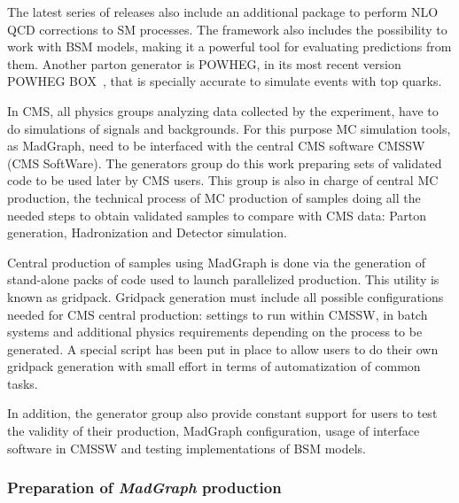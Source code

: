 The latest series of releases also include an additional package to perform NLO QCD corrections to SM processes. The framework also includes the possibility to work with BSM models, making it a powerful tool for evaluating predictions from them. Another parton generator is POWHEG, in its most recent version POWHEG BOX~\cite{Nason:2004rx, Frixione:2007vw, Alioli:2010xd}, that is specially accurate to simulate events with top quarks. %

In CMS, all physics groups analyzing data collected by the experiment, have to do simulations of signals and backgrounds. For this purpose MC simulation tools, as MadGraph, need to be interfaced with the central CMS software CMSSW (CMS SoftWare). The generators group do this work preparing sets of validated code to be used later by CMS users. This group is also in charge of central MC production, the technical process of MC production of samples doing all the needed steps to obtain validated samples to compare with CMS data: Parton generation, Hadronization and Detector simulation. 

Central production of samples using MadGraph is done via the generation of stand-alone packs of code used to launch parallelized production. This utility is known as gridpack. Gridpack generation must include all possible configurations needed for CMS central production: settings to run within CMSSW, in batch systems and additional physics requirements depending on the process to be generated. A special script has been put in place to allow users to do their own gridpack generation with small effort in terms of automatization of common tasks.

In addition, the generator group also provide constant support for users to test the validity of their production, MadGraph configuration, usage of interface software in CMSSW and testing implementations of BSM models.

\subsubsection{Preparation of \textit{MadGraph} production}

